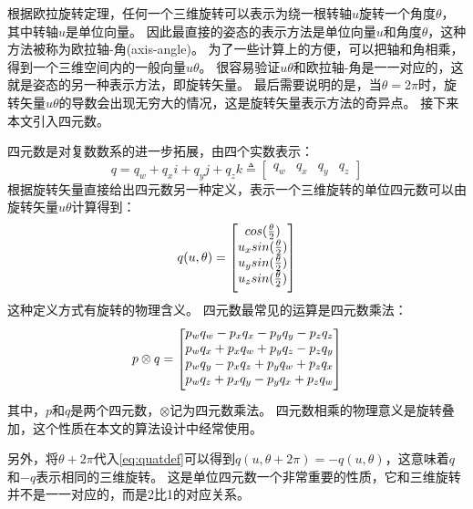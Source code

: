 \documentclass[
  type=master
]{gdutthesis}
\begin{document}
根据欧拉旋转定理，任何一个三维旋转可以表示为绕一根转轴$u$旋转一个角度$\theta$，其中转轴$u$是单位向量\cite{palais2007euler}。
因此最直接的姿态的表示方法是单位向量$u$和角度$\theta$，这种方法被称为欧拉轴-角(axis-angle)。
为了一些计算上的方便，可以把轴和角相乘，得到一个三维空间内的一般向量$u\theta$。
很容易验证$u\theta$和欧拉轴-角是一一对应的，这就是姿态的另一种表示方法，即旋转矢量。
最后需要说明的是，当$\theta = 2\pi$时，旋转矢量$u\theta$的导数会出现无穷大的情况，这是旋转矢量表示方法的奇异点。
接下来本文引入四元数。

四元数是对复数数系的进一步拓展，由四个实数表示：
\begin{equation}\label{eq:quatdef1}
	q = q_w + q_x i + q_y j + q_z k \triangleq 
		\begin{bmatrix}
			q_w & q_x & q_y & q_z
		\end{bmatrix}
\end{equation}
根据旋转矢量直接给出四元数另一种定义，表示一个三维旋转的单位四元数可以由旋转矢量$u\theta$计算得到：
\begin{equation}\label{eq:quatdef}
	q(u,\theta) = 
	\begin{bmatrix}
		cos(\frac{\theta}{2}) \\
		u_x sin(\frac{\theta}{2}) \\
		u_y sin(\frac{\theta}{2}) \\
		u_z sin(\frac{\theta}{2})\vspace{1ex}
	\end{bmatrix}	
\end{equation}
\vspace{1ex}这种定义方式有旋转的物理含义。
四元数最常见的运算是四元数乘法：
\begin{equation}
	p \otimes q = 
	\begin{bmatrix}
		p_w q_w - p_x q_x - p_y q_y - p_z q_z \\
		p_w q_x + p_x q_w + p_y q_z - p_z q_y \\
		p_w q_y - p_x q_z + p_y q_w + p_z q_x \\
		p_w q_z + p_x q_y - p_y q_x + p_z q_w \vspace{1ex}
	\end{bmatrix}	
\end{equation}
其中，$p$和$q$是两个四元数，$\otimes$记为四元数乘法。
四元数相乘的物理意义是旋转叠加，这个性质在本文的算法设计中经常使用。

另外，将$\theta + 2\pi$代入\autoref{eq:quatdef}可以得到$q(u,\theta + 2\pi)=-q(u,\theta)$，这意味着$q$和$-q$表示相同的三维旋转。
这是单位四元数一个非常重要的性质，它和三维旋转并不是一一对应的，而是2比1的对应关系。
\end{document}
